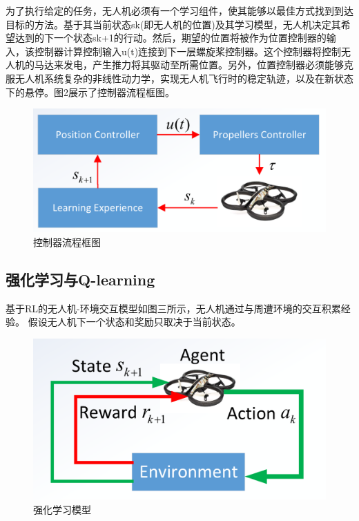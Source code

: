 \documentclass{thuemp}
\begin{document}
为了执行给定的任务，无人机必须有一个学习组件，使其能够以最佳方式找到到达目标的方法。基于其当前状态sk(即无人机的位置)及其学习模型，无人机决定其希望达到的下一个状态sk+1的行动。然后，期望的位置将被作为位置控制器的输入，该控制器计算控制输入u(t)连接到下一层螺旋桨控制器。这个控制器将控制无人机的马达来发电，产生推力将其驱动至所需位置。另外，位置控制器必须能够克服无人机系统复杂的非线性动力学，实现无人机飞行时的稳定轨迹，以及在新状态下的悬停。图2展示了控制器流程框图。
\begin{figure}[H]
\centering
\includegraphics[width=0.8\linewidth]{./image/fig (2).png}
\caption{控制器流程框图} \label{fig:2}
\end{figure}
\subsection{强化学习与Q-learning}
基于RL的无人机-环境交互模型如图三所示，无人机通过与周遭环境的交互积累经验。
假设无人机下一个状态和奖励只取决于当前状态。
\begin{figure}[H]
\centering
\includegraphics[width=0.8\linewidth]{./image/fig (3).png}
\caption{强化学习模型} \label{fig:3}
\end{figure}
\end{document}
